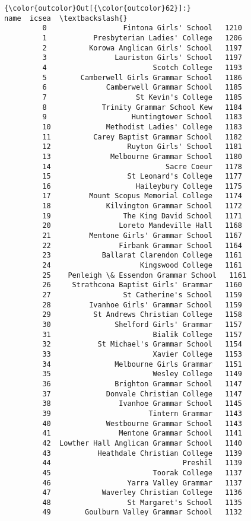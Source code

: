 \documentclass[11pt]{article}
\begin{document}
\begin{Verbatim}[commandchars=\\\{\}]
{\color{outcolor}Out[{\color{outcolor}62}]:}                                     name  icsea  \textbackslash{}
         0                  Fintona Girls' School   1210   
         1           Presbyterian Ladies' College   1206   
         2          Korowa Anglican Girls' School   1197   
         3                Lauriston Girls' School   1197   
         4                         Scotch College   1193   
         5        Camberwell Girls Grammar School   1186   
         6              Camberwell Grammar School   1185   
         7                     St Kevin's College   1185   
         8             Trinity Grammar School Kew   1184   
         9                    Huntingtower School   1183   
         10             Methodist Ladies' College   1183   
         11          Carey Baptist Grammar School   1182   
         12                  Ruyton Girls' School   1181   
         13              Melbourne Grammar School   1180   
         14                           Sacre Coeur   1178   
         15                  St Leonard's College   1177   
         16                    Haileybury College   1175   
         17         Mount Scopus Memorial College   1174   
         18             Kilvington Grammar School   1172   
         19                 The King David School   1171   
         20                Loreto Mandeville Hall   1168   
         21         Mentone Girls' Grammar School   1167   
         22                Firbank Grammar School   1164   
         23            Ballarat Clarendon College   1161   
         24                     Kingswood College   1161   
         25    Penleigh \& Essendon Grammar School   1161   
         26     Strathcona Baptist Girls' Grammar   1160   
         27                 St Catherine's School   1159   
         28         Ivanhoe Girls' Grammar School   1159   
         29          St Andrews Christian College   1158   
         30               Shelford Girls' Grammar   1157   
         31                        Bialik College   1157   
         32           St Michael's Grammar School   1154   
         33                        Xavier College   1153   
         34               Melbourne Girls Grammar   1151   
         35                        Wesley College   1149   
         36               Brighton Grammar School   1147   
         37             Donvale Christian College   1147   
         38                Ivanhoe Grammar School   1145   
         39                       Tintern Grammar   1143   
         40             Westbourne Grammar School   1143   
         41                Mentone Grammar School   1141   
         42  Lowther Hall Anglican Grammar School   1140   
         43           Heathdale Christian College   1139   
         44                               Preshil   1139   
         45                        Toorak College   1137   
         46                  Yarra Valley Grammar   1137   
         47            Waverley Christian College   1136   
         48                  St Margaret's School   1135   
         49        Goulburn Valley Grammar School   1132   
         

\end{Verbatim}
\end{document}
